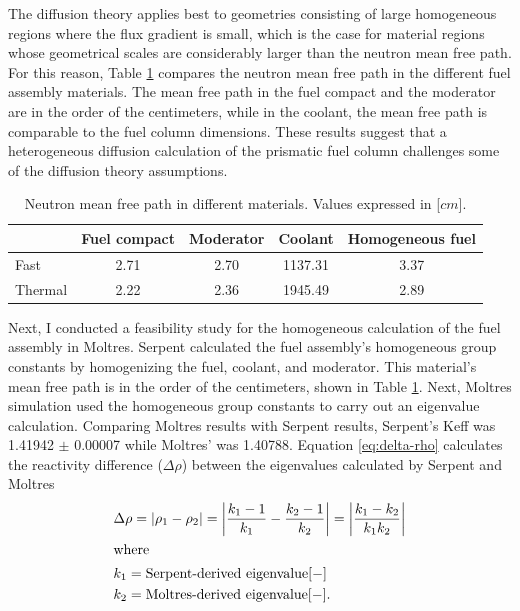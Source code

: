 The diffusion theory applies best to geometries consisting of large homogeneous regions where the flux gradient is small, which is the case for material regions whose geometrical scales are considerably larger than the neutron mean free path.
For this reason, Table \ref{tab:mfp} compares the neutron mean free path in the different fuel assembly materials.
The mean free path in the fuel compact and the moderator are in the order of the centimeters, while in the coolant, the mean free path is comparable to the fuel column dimensions.
These results suggest that a heterogeneous diffusion calculation of the prismatic fuel column challenges some of the diffusion theory assumptions.

\begin{table}[htbp!]
  \centering
  \caption{Neutron mean free path in different materials. Values expressed in [$cm$].}
  \begin{tabular}{lcccc}
  \toprule
              & Fuel compact  & Moderator  & Coolant  & Homogeneous fuel \\
  \midrule
  Fast  		  & 2.71 & 2.70 & 1137.31 & 3.37 \\
  Thermal		  & 2.22 & 2.36 & 1945.49 & 2.89 \\
  \bottomrule
  \end{tabular}
  \label{tab:mfp}
\end{table}

Next, I conducted a feasibility study for the homogeneous calculation of the fuel assembly in Moltres.
Serpent calculated the fuel assembly's homogeneous group constants by homogenizing the fuel, coolant, and moderator.
This material's mean free path is in the order of the centimeters, shown in Table \ref{tab:mfp}.
Next, Moltres simulation used the homogeneous group constants to carry out an eigenvalue calculation.
Comparing Moltres results with Serpent results, Serpent's \gls{Keff} was 1.41942 $\pm$ 0.00007 while Moltres' was 1.40788.
Equation \ref{eq:delta-rho} calculates the reactivity difference ($\Delta \rho$) between the eigenvalues calculated by Serpent and Moltres
\begin{align}
  & \Delta \rho = \left| \rho_1 - \rho_2 \right| = \left| \frac{k_1-1}{k_1} - \frac{k_2-1}{k_2} \right| = \left| \frac{k_1-k_2}{k_1 k_2} \right| \label{eq:delta-rho} \\
  \intertext{where}
  & k_1 = \mbox{Serpent-derived eigenvalue} [-] \notag \\
  & k_2 = \mbox{Moltres-derived eigenvalue} [-]. \notag
\end{align}

